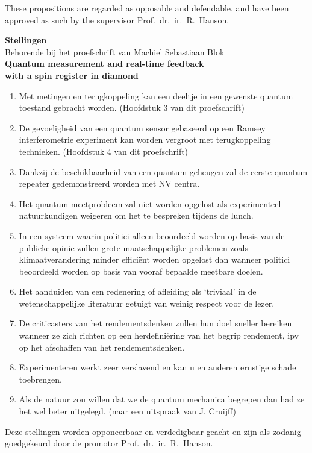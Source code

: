 \documentclass[9pt,a5paper]{memoir}
\begin{document}

\noindent
These propositions are regarded as opposable and defendable, and have been approved as such by the supervisor Prof.~dr.~ir.~R.~Hanson.

\newpage

\thispagestyle{empty}
\begin{center}
\LARGE{\textbf{Stellingen}}\\[11pt]
\large{Behorende bij het proefschrift van Machiel Sebastiaan Blok}\\[11pt]
\large{\textbf{Quantum measurement and real-time feedback \\
\noindent with a spin register in diamond}}\\[11pt]
\end{center}

\noindent
\begin{enumerate}
\item Met metingen en terugkoppeling kan een deeltje in een gewenste quantum toestand gebracht worden. (Hoofdstuk 3 van dit proefschrift)

\item De gevoeligheid van een quantum sensor gebaseerd op een Ramsey interferometrie experiment kan worden vergroot met terugkoppeling technieken. (Hoofdstuk 4 van dit proefschrift)

\item Dankzij de beschikbaarheid van een quantum geheugen zal de eerste quantum repeater gedemonstreerd worden met NV centra.

\item Het quantum meetprobleem zal niet worden opgelost als experimenteel natuurkundigen weigeren om het te bespreken tijdens de lunch.

\item In een systeem waarin politici alleen beoordeeld worden op basis van de publieke opinie zullen grote maatschappelijke problemen zoals klimaatverandering minder effici\"{e}nt worden opgelost dan wanneer politici beoordeeld worden op basis van vooraf bepaalde meetbare doelen.

\item Het aanduiden van een redenering of afleiding als `triviaal' in de wetenschappelijke literatuur getuigt van weinig respect voor de lezer.

\item De criticasters van het rendementsdenken zullen hun doel sneller bereiken wanneer ze zich richten op een herdefini\"{e}ring van het begrip rendement, ipv op het afschaffen van het rendementsdenken.

\item Experimenteren werkt zeer verslavend en kan u en anderen ernstige schade toebrengen.

\item Als de natuur zou willen dat we de quantum mechanica begrepen dan had ze het wel beter uitgelegd. (naar een uitspraak van J. Cruijff)	
\end{enumerate}


\noindent
Deze stellingen worden opponeerbaar en verdedigbaar geacht en zijn als zodanig goedgekeurd door de promotor Prof.~dr.~ir.~R.~Hanson.
\end{document}
